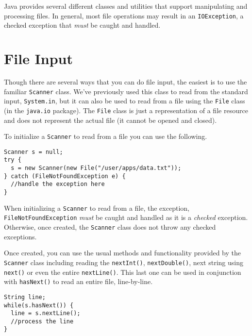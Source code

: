 

Java provides several different classes and 
utilities that support manipulating and processing
files.  In general, most file operations may
result in an \texttt{IOException}, 
a checked exception that \emph{must} be caught
and handled.

\section{File Input}

Though there are several ways that you can do file
input, the easiest is to use the familiar 
\texttt{Scanner} class.  We've previously
used this class to read from the standard input, 
\texttt{System.in}, but it can also be
used to read from a file using the \texttt{File} 
class (in the \texttt{java.io} package).  
The \texttt{File} class is just
a representation of a file resource and does not
represent the actual file (it cannot be opened and
closed).  

To initialize a \texttt{Scanner} to read
from a file you can use the following.

\begin{verbatim}
Scanner s = null;
try {
  s = new Scanner(new File("/user/apps/data.txt"));
} catch (FileNotFoundException e) {
  //handle the exception here
}
\end{verbatim}

When initializing a \texttt{Scanner} to
read from a file, the exception, 
\texttt{FileNotFoundException} \emph{must} be caught
and handled as it is a \emph{checked} exception.  Otherwise, once created, the \texttt{Scanner}
class does not throw any checked exceptions.

Once created, you can use the usual methods and functionality
provided by the \texttt{Scanner} class including
reading the \texttt{nextInt()}, \texttt{nextDouble()}, 
next string using \texttt{next()} or even the
entire \texttt{nextLine()}.  This last one
can be used in conjunction with \texttt{hasNext()}
to read an entire file, line-by-line.

\begin{verbatim}
String line;
while(s.hasNext()) {
  line = s.nextLine();
  //process the line
}
\end{verbatim}

